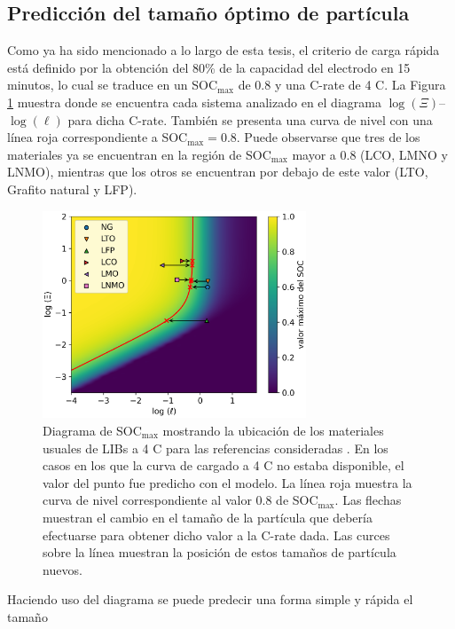 \subsection{Predicción del tamaño óptimo de partícula}

Como ya ha sido mencionado a lo largo de esta tesis, el criterio de carga rápida
está definido por la obtención del 80\% de la capacidad del electrodo en 15 
minutos, lo cual se traduce en un SOC$_{\max}$ de 0.8 y una C-rate de 4 C. La
Figura \ref{fig:prediccion} muestra donde se encuentra cada sistema analizado en
el diagrama $\log(\Xi)$--$\log(\ell)$ para dicha C-rate. También se presenta una
curva de nivel con una línea roja correspondiente a SOC$_{\max} = 0.8$. Puede
observarse que tres de los materiales ya se encuentran en la región de 
SOC$_{\max}$ mayor a 0.8 (LCO, LMNO y LNMO), mientras que los otros se encuentran
por debajo de este valor (LTO, Grafito natural y LFP).
\begin{figure}[h!]
    \centering
    \includegraphics[width=0.7\textwidth]{FastCharging/un/resultados/prediccion/prediccion.png}
    \caption{Diagrama de SOC$_{\max}$ mostrando la ubicación de los materiales 
    usuales de LIBs a 4 C para las referencias consideradas \cite{mancini2022,
    he2012, lei2015, wang2019high, bak2011, nishikawa2017}. En los casos en los 
    que la curva de cargado a 4 C no estaba disponible, el valor del punto fue 
    predicho con el modelo. La línea roja muestra la curva de nivel 
    correspondiente al valor 0.8 de SOC$_{\max}$. Las flechas muestran el cambio
    en el tamaño de la partícula que debería efectuarse para obtener dicho valor
    a la C-rate dada. Las curces sobre la línea muestran la posición de estos
    tamaños de partícula nuevos.}
    \label{fig:prediccion}
\end{figure}
Haciendo uso del diagrama se puede predecir una forma simple y rápida el tamaño 
